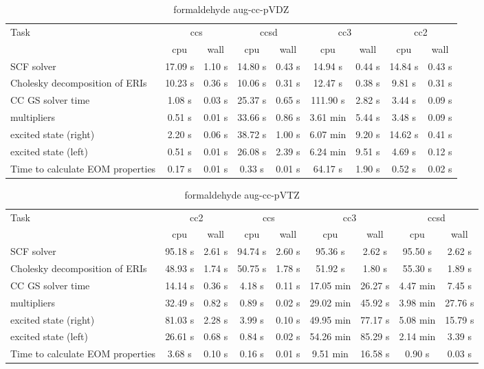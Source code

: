 \documentclass{article}
\begin{document}
\begin{table}
\caption{formaldehyde aug-cc-pVDZ}
\begin{tabular}{lcccccccc}
\toprule
Task & \multicolumn{2}{c}{ccs} & \multicolumn{2}{c}{ccsd} & \multicolumn{2}{c}{cc3} & \multicolumn{2}{c}{cc2}\\
\cmidrule(lr){2-3}\cmidrule(lr){4-5}\cmidrule(lr){6-7}\cmidrule(lr){8-9}
 & cpu & wall & cpu & wall & cpu & wall & cpu & wall\\
\midrule
SCF solver & 17.09 s & 1.10 s & 14.80 s & 0.43 s & 14.94 s & 0.44 s & 14.84 s & 0.43 s\\
Cholesky decomposition of ERIs & 10.23 s & 0.36 s & 10.06 s & 0.31 s & 12.47 s & 0.38 s & 9.81 s & 0.31 s\\
CC GS solver time & 1.08 s & 0.03 s & 25.37 s & 0.65 s & 111.90 s & 2.82 s & 3.44 s & 0.09 s\\
multipliers & 0.51 s & 0.01 s & 33.66 s & 0.86 s & 3.61 min & 5.44 s & 3.48 s & 0.09 s\\
excited state (right) & 2.20 s & 0.06 s & 38.72 s & 1.00 s & 6.07 min & 9.20 s & 14.62 s & 0.41 s\\
excited state (left) & 0.51 s & 0.01 s & 26.08 s & 2.39 s & 6.24 min & 9.51 s & 4.69 s & 0.12 s\\
Time to calculate EOM properties & 0.17 s & 0.01 s & 0.33 s & 0.01 s & 64.17 s & 1.90 s & 0.52 s & 0.02 s\\
\bottomrule
\end{tabular}
\end{table}
\begin{table}
\caption{formaldehyde aug-cc-pVTZ}
\begin{tabular}{lcccccccc}
\toprule
Task & \multicolumn{2}{c}{cc2} & \multicolumn{2}{c}{ccs} & \multicolumn{2}{c}{cc3} & \multicolumn{2}{c}{ccsd}\\
\cmidrule(lr){2-3}\cmidrule(lr){4-5}\cmidrule(lr){6-7}\cmidrule(lr){8-9}
 & cpu & wall & cpu & wall & cpu & wall & cpu & wall\\
\midrule
SCF solver & 95.18 s & 2.61 s & 94.74 s & 2.60 s & 95.36 s & 2.62 s & 95.50 s & 2.62 s\\
Cholesky decomposition of ERIs & 48.93 s & 1.74 s & 50.75 s & 1.78 s & 51.92 s & 1.80 s & 55.30 s & 1.89 s\\
CC GS solver time & 14.14 s & 0.36 s & 4.18 s & 0.11 s & 17.05 min & 26.27 s & 4.47 min & 7.45 s\\
multipliers & 32.49 s & 0.82 s & 0.89 s & 0.02 s & 29.02 min & 45.92 s & 3.98 min & 27.76 s\\
excited state (right) & 81.03 s & 2.28 s & 3.99 s & 0.10 s & 49.95 min & 77.17 s & 5.08 min & 15.79 s\\
excited state (left) & 26.61 s & 0.68 s & 0.84 s & 0.02 s & 54.26 min & 85.29 s & 2.14 min & 3.39 s\\
Time to calculate EOM properties & 3.68 s & 0.10 s & 0.16 s & 0.01 s & 9.51 min & 16.58 s & 0.90 s & 0.03 s\\
\bottomrule
\end{tabular}
\end{table}
\end{document}
